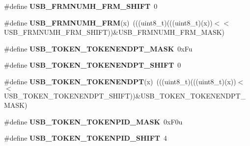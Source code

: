 \begin{DoxyCompactItemize}
\item 
\#define {\bfseries U\+S\+B\+\_\+\+F\+R\+M\+N\+U\+M\+H\+\_\+\+F\+R\+M\+\_\+\+S\+H\+I\+FT}~0\hypertarget{group__USB__Register__Masks_gacb18c63687d37e245a79d7e7551823a3}{}\label{group__USB__Register__Masks_gacb18c63687d37e245a79d7e7551823a3}

\item 
\#define {\bfseries U\+S\+B\+\_\+\+F\+R\+M\+N\+U\+M\+H\+\_\+\+F\+RM}(x)~(((uint8\+\_\+t)(((uint8\+\_\+t)(x))$<$$<$U\+S\+B\+\_\+\+F\+R\+M\+N\+U\+M\+H\+\_\+\+F\+R\+M\+\_\+\+S\+H\+I\+FT))\&U\+S\+B\+\_\+\+F\+R\+M\+N\+U\+M\+H\+\_\+\+F\+R\+M\+\_\+\+M\+A\+SK)\hypertarget{group__USB__Register__Masks_gafe9face0ec6a617199ad76945c034da8}{}\label{group__USB__Register__Masks_gafe9face0ec6a617199ad76945c034da8}

\item 
\#define {\bfseries U\+S\+B\+\_\+\+T\+O\+K\+E\+N\+\_\+\+T\+O\+K\+E\+N\+E\+N\+D\+P\+T\+\_\+\+M\+A\+SK}~0x\+Fu\hypertarget{group__USB__Register__Masks_gaa0d3bc1d6ff63ebbccad8b898e39cc84}{}\label{group__USB__Register__Masks_gaa0d3bc1d6ff63ebbccad8b898e39cc84}

\item 
\#define {\bfseries U\+S\+B\+\_\+\+T\+O\+K\+E\+N\+\_\+\+T\+O\+K\+E\+N\+E\+N\+D\+P\+T\+\_\+\+S\+H\+I\+FT}~0\hypertarget{group__USB__Register__Masks_ga08c6b329c95f8ac5a39eecfbd347cce2}{}\label{group__USB__Register__Masks_ga08c6b329c95f8ac5a39eecfbd347cce2}

\item 
\#define {\bfseries U\+S\+B\+\_\+\+T\+O\+K\+E\+N\+\_\+\+T\+O\+K\+E\+N\+E\+N\+D\+PT}(x)~(((uint8\+\_\+t)(((uint8\+\_\+t)(x))$<$$<$U\+S\+B\+\_\+\+T\+O\+K\+E\+N\+\_\+\+T\+O\+K\+E\+N\+E\+N\+D\+P\+T\+\_\+\+S\+H\+I\+FT))\&U\+S\+B\+\_\+\+T\+O\+K\+E\+N\+\_\+\+T\+O\+K\+E\+N\+E\+N\+D\+P\+T\+\_\+\+M\+A\+SK)\hypertarget{group__USB__Register__Masks_ga7ac5c83cc884b69828af1c56818e46ab}{}\label{group__USB__Register__Masks_ga7ac5c83cc884b69828af1c56818e46ab}

\item 
\#define {\bfseries U\+S\+B\+\_\+\+T\+O\+K\+E\+N\+\_\+\+T\+O\+K\+E\+N\+P\+I\+D\+\_\+\+M\+A\+SK}~0x\+F0u\hypertarget{group__USB__Register__Masks_ga8880174ec35cfb684d2bcc6e0d5a52bc}{}\label{group__USB__Register__Masks_ga8880174ec35cfb684d2bcc6e0d5a52bc}

\item 
\#define {\bfseries U\+S\+B\+\_\+\+T\+O\+K\+E\+N\+\_\+\+T\+O\+K\+E\+N\+P\+I\+D\+\_\+\+S\+H\+I\+FT}~4\hypertarget{group__USB__Register__Masks_gae410fcf426d2212be6468703734f6ed9}{}\label{group__USB__Register__Masks_gae410fcf426d2212be6468703734f6ed9}


\end{DoxyCompactItemize}

